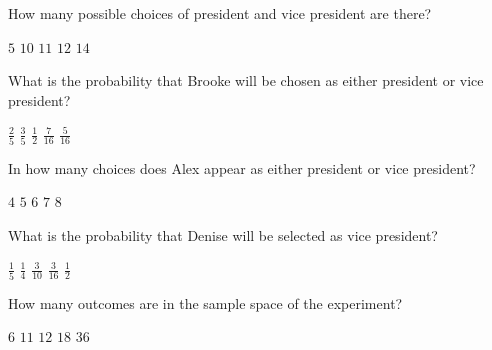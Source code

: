 \documentclass[answers,12pt]{exam}
\begin{document}
\begin{questions}
\question\label{FirstPresident}
How many possible choices of president and vice president are there?\\
\begin{oneparchoices}
\choice $5$ %
\correctchoice $10$
\choice $11$ %
\choice $12$ %
\choice $14$ %
\end{oneparchoices}

\question
What is the probability that Brooke will be chosen
as either president or vice president?\\
\begin{oneparchoices}
\choice $\frac{2}{5}$ %
\correctchoice $\frac{3}{5}$
\choice $\frac{1}{2}$ %
\choice $\frac{7}{16}$ %
\choice $\frac{5}{16}$ %
\end{oneparchoices}

\question
In how many choices does Alex appear as either president
or vice president?\\
\begin{oneparchoices}
\correctchoice $4$
\choice $5$ %
\choice $6$ %
\choice $7$
\choice $8$
\end{oneparchoices}

\question\label{LastPresident}
What is the probability that Denise will be selected
as vice president?\\
\begin{oneparchoices}
\correctchoice $\frac{1}{5}$
\choice $\frac{1}{4}$ %
\choice $\frac{3}{10}$ %
\choice $\frac{3}{16}$ %
\choice $\frac{1}{2}$ %
\end{oneparchoices}


\question\label{FirstDice}
How many outcomes are in the sample space of the experiment?\\
\begin{oneparchoices}
\choice $6$ %
\choice $11$ %
\choice $12$ %
\choice $18$
\correctchoice $36$
\end{oneparchoices}


\end{questions}
\end{document}
